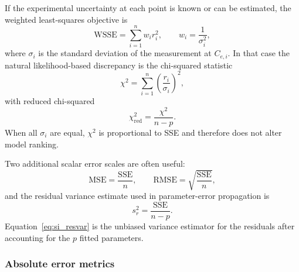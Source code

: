 \documentclass[journal=jacsat,manuscript=article]{achemso}
\begin{document}
If the experimental uncertainty at each point is known or can be
estimated, the weighted least-squares objective is
\begin{equation}
	\mathrm{WSSE}
	=
	\sum_{i=1}^{n} w_i r_i^2,
	\qquad
	w_i = \frac{1}{\sigma_i^2},
	\label{eq:si_WSSE}
\end{equation}
where $\sigma_i$ is the standard deviation of the measurement at
$C_{e,i}$. In that case the natural likelihood-based discrepancy is the
chi-squared statistic
\begin{equation}
	\chi^2
	=
	\sum_{i=1}^{n}
	\left(\frac{r_i}{\sigma_i}\right)^2,
	\label{eq:si_chi2}
\end{equation}
with reduced chi-squared
\begin{equation}
	\chi^2_{\mathrm{red}}
	=
	\frac{\chi^2}{n-p}.
	\label{eq:si_chi2red}
\end{equation}
When all $\sigma_i$ are equal, $\chi^2$ is proportional to SSE and
therefore does not alter model ranking.

Two additional scalar error scales are often useful:
\begin{equation}
	\mathrm{MSE} = \frac{\mathrm{SSE}}{n},
	\qquad
	\mathrm{RMSE} = \sqrt{\frac{\mathrm{SSE}}{n}},
	\label{eq:si_MSE_RMSE}
\end{equation}
and the residual variance estimate used in parameter-error propagation is
\begin{equation}
	s_r^2 = \frac{\mathrm{SSE}}{n-p}.
	\label{eq:si_resvar}
\end{equation}
Equation~\eqref{eq:si_resvar} is the unbiased variance estimator for the
residuals after accounting for the $p$ fitted parameters.

\subsubsection{Absolute error metrics}
\end{document}
